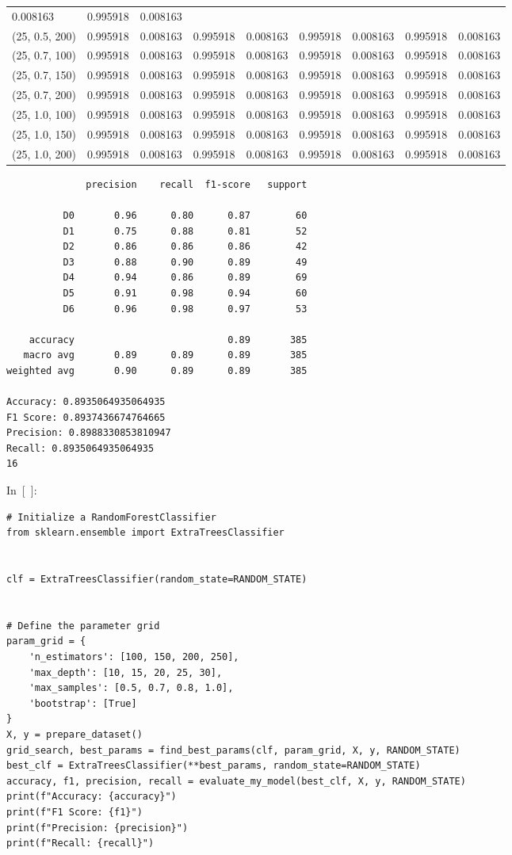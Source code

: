 \documentclass[
  english,
]{article}
\begin{document}
\begin{longtable}[]{@{}lllllllll@{}}
0.008163 & 0.995918 & 0.008163\tabularnewline
(25, 0.5, 200) & 0.995918 & 0.008163 & 0.995918 & 0.008163 & 0.995918 &
0.008163 & 0.995918 & 0.008163\tabularnewline
(25, 0.7, 100) & 0.995918 & 0.008163 & 0.995918 & 0.008163 & 0.995918 &
0.008163 & 0.995918 & 0.008163\tabularnewline
(25, 0.7, 150) & 0.995918 & 0.008163 & 0.995918 & 0.008163 & 0.995918 &
0.008163 & 0.995918 & 0.008163\tabularnewline
(25, 0.7, 200) & 0.995918 & 0.008163 & 0.995918 & 0.008163 & 0.995918 &
0.008163 & 0.995918 & 0.008163\tabularnewline
(25, 1.0, 100) & 0.995918 & 0.008163 & 0.995918 & 0.008163 & 0.995918 &
0.008163 & 0.995918 & 0.008163\tabularnewline
(25, 1.0, 150) & 0.995918 & 0.008163 & 0.995918 & 0.008163 & 0.995918 &
0.008163 & 0.995918 & 0.008163\tabularnewline
(25, 1.0, 200) & 0.995918 & 0.008163 & 0.995918 & 0.008163 & 0.995918 &
0.008163 & 0.995918 & 0.008163\tabularnewline
\bottomrule
\end{longtable}

\begin{verbatim}
              precision    recall  f1-score   support

          D0       0.96      0.80      0.87        60
          D1       0.75      0.88      0.81        52
          D2       0.86      0.86      0.86        42
          D3       0.88      0.90      0.89        49
          D4       0.94      0.86      0.89        69
          D5       0.91      0.98      0.94        60
          D6       0.96      0.98      0.97        53

    accuracy                           0.89       385
   macro avg       0.89      0.89      0.89       385
weighted avg       0.90      0.89      0.89       385

Accuracy: 0.8935064935064935
F1 Score: 0.8937436674764665
Precision: 0.8988330853810947
Recall: 0.8935064935064935
16
\end{verbatim}

In~{[}~{]}:

\begin{verbatim}
# Initialize a RandomForestClassifier
from sklearn.ensemble import ExtraTreesClassifier


clf = ExtraTreesClassifier(random_state=RANDOM_STATE)


# Define the parameter grid
param_grid = {
    'n_estimators': [100, 150, 200, 250],
    'max_depth': [10, 15, 20, 25, 30],
    'max_samples': [0.5, 0.7, 0.8, 1.0],
    'bootstrap': [True]
}
X, y = prepare_dataset()
grid_search, best_params = find_best_params(clf, param_grid, X, y, RANDOM_STATE)
best_clf = ExtraTreesClassifier(**best_params, random_state=RANDOM_STATE)
accuracy, f1, precision, recall = evaluate_my_model(best_clf, X, y, RANDOM_STATE)
print(f"Accuracy: {accuracy}")
print(f"F1 Score: {f1}")
print(f"Precision: {precision}")
print(f"Recall: {recall}")
\end{verbatim}
\end{document}
